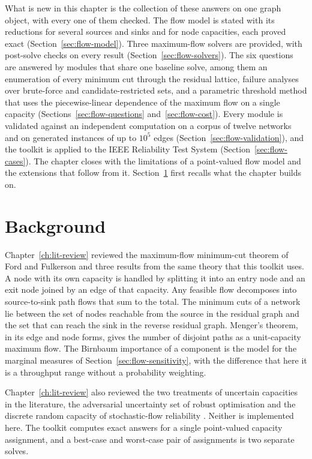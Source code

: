 \documentclass[12pt]{report}
\begin{document}
What is new in this chapter is the collection of these answers on one graph object, with
every one of them checked. The flow model is stated with its reductions for several sources
and sinks and for node capacities, each proved exact (Section~\ref{sec:flow-model}). Three
maximum-flow solvers are provided, with post-solve checks on every result
(Section~\ref{sec:flow-solvers}). The six questions are answered by modules that share one
baseline solve, among them an enumeration of every minimum cut through the residual lattice,
failure analyses over brute-force and candidate-restricted sets, and a parametric threshold
method that uses the piecewise-linear dependence of the maximum flow on a single capacity
(Sections~\ref{sec:flow-questions} and~\ref{sec:flow-cost}). Every module is validated
against an independent computation on a corpus of twelve networks and on generated
instances of up to $10^5$ edges (Section~\ref{sec:flow-validation}), and the toolkit is
applied to the IEEE Reliability Test System (Section~\ref{sec:flow-cases}). The chapter
closes with the limitations of a point-valued flow model and the extensions that follow from
it. Section~\ref{sec:flow-background} first recalls what the chapter builds on.

\section{Background}
\label{sec:flow-background}

Chapter~\ref{ch:lit-review} reviewed the maximum-flow minimum-cut theorem of Ford and
Fulkerson \cite{ford1956,ford1962} and three results from the same theory that this toolkit
uses. A node with its own capacity is handled by splitting it into an entry node and an exit
node joined by an edge of that capacity. Any feasible flow decomposes into source-to-sink
path flows that sum to the total. The minimum cuts of a network lie between the set of nodes
reachable from the source in the residual graph and the set that can reach the sink in the
reverse residual graph. Menger's theorem, in its edge and node
forms, gives the number of disjoint paths as a unit-capacity maximum flow. The Birnbaum
importance of a component \cite{birnbaum1969} is the model for the marginal measures of
Section~\ref{sec:flow-sensitivity}, with the difference that here it is a throughput range
without a probability weighting.

Chapter~\ref{ch:lit-review} also reviewed the two treatments of uncertain capacities in the
literature, the adversarial uncertainty set of robust optimisation
\cite{bertsimas2013robust} and the discrete random capacity of stochastic-flow reliability
\cite{doulliez1972transportation}. Neither is implemented here. The toolkit computes exact
answers for a single point-valued capacity assignment, and a best-case and worst-case pair of
assignments is two separate solves.
\end{document}
